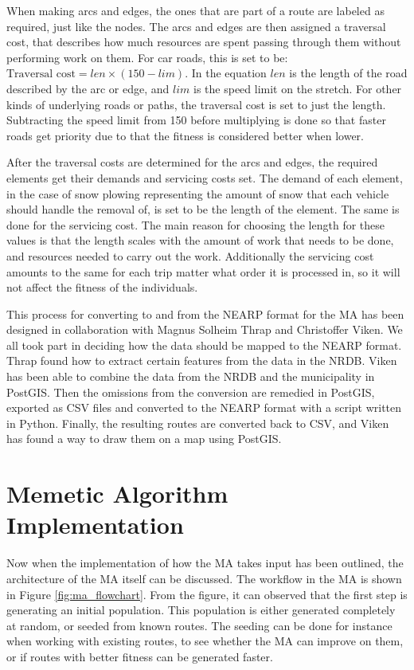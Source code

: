 When making arcs and edges, the ones that are part of a route are labeled as required, just like the nodes. The arcs and edges are then assigned a traversal cost, that describes how much resources are spent passing through them without performing work on them. For car roads, this is set to be: $\text{Traversal cost} = len \times (150 - lim)$. In the equation $len$ is the length of the road described by the arc or edge, and $lim$ is the speed limit on the stretch. For other kinds of underlying roads or paths, the traversal cost is set to just the length. Subtracting the speed limit from 150 before multiplying is done so that faster roads get priority due to that the fitness is considered better when lower.

After the traversal costs are determined for the arcs and edges, the required elements get their demands and servicing costs set. The demand of each element, in the case of snow plowing representing the amount of snow that each vehicle should handle the removal of, is set to be the length of the element. The same is done for the servicing cost. The main reason for choosing the length for these values is that the length scales with the amount of work that needs to be done, and resources needed to carry out the work. Additionally the servicing cost amounts to the same for each trip matter what order it is processed in, so it will not affect the fitness of the individuals.

This process for converting to and from the NEARP format for the MA has been designed in collaboration with Magnus Solheim Thrap and Christoffer Viken. We all took part in deciding how the data should be mapped to the NEARP format. Thrap found how to extract certain features from the data in the NRDB. Viken has been able to combine the data from the NRDB and the municipality in PostGIS. Then the omissions from the conversion are remedied in PostGIS, exported as CSV files and converted to the NEARP format with a script written in Python. Finally, the resulting routes are converted back to CSV, and Viken has found a way to draw them on a map using PostGIS.


\section{Memetic Algorithm Implementation} %
\label{sec:memetic_algorithm_implementation}

Now when the implementation of how the MA takes input has been outlined, the architecture of the MA itself can be discussed. The workflow in the MA is shown in Figure \ref{fig:ma_flowchart}. From the figure, it can observed that the first step is generating an initial population. This population is either generated completely at random, or seeded from known routes. The seeding can be done for instance when working with existing routes, to see whether the MA can improve on them, or if routes with better fitness can be generated faster.

